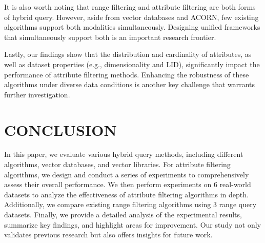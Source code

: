 \documentclass[sigconf, nonacm]{acmart}
\begin{document}
It is also worth noting that range filtering and attribute filtering are both forms of hybrid query. However, aside from vector databases and ACORN, few existing algorithms support both modalities simultaneously. Designing unified frameworks that simultaneously support both is an important research frontier. 

Lastly, our findings show that the distribution and cardinality of attributes, as well as dataset properties (e.g., dimensionality and LID), significantly impact the performance of attribute filtering methods. Enhancing the robustness of these algorithms under diverse data conditions is another key challenge that warrants further investigation.


\section{CONCLUSION}

In this paper, we evaluate various hybrid query methods, including different algorithms, vector databases, and vector libraries. For attribute filtering algorithms, we design and conduct a series of experiments to comprehensively assess their overall performance. We then perform experiments on 6 real-world datasets to analyze the effectiveness of attribute filtering algorithms in depth. Additionally, we compare existing range filtering algorithms using 3 range query datasets. Finally, we provide a detailed analysis of the experimental results, summarize key findings, and highlight areas for improvement. Our study not only validates previous research but also offers insights for future work.



\clearpage



\end{document}
